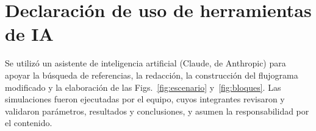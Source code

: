 \section*{Declaración de uso de herramientas de IA}
Se utilizó un asistente de inteligencia artificial (Claude, de Anthropic) para
apoyar la búsqueda de referencias, la redacción, la construcción del flujograma
modificado y la elaboración de las Figs.~\ref{fig:escenario}
y~\ref{fig:bloques}. Las simulaciones fueron ejecutadas por el equipo, cuyos
integrantes revisaron y validaron parámetros, resultados y conclusiones, y
asumen la responsabilidad por el contenido.
